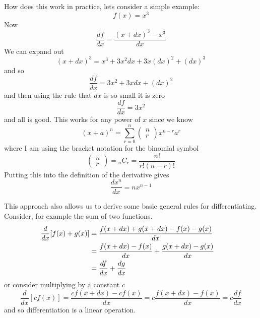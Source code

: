 \documentclass[12pt]{article}
\begin{document}
How does this work in practice, lets consider a simple example:
\begin{equation}
  f(x)=x^3
\end{equation}
Now
\begin{equation}
  \frac{df}{dx}=\frac{(x+dx)^3-x^3}{dx}
\end{equation}
We can expand out
\begin{equation}
  (x+dx)^3=x^3+3x^2dx+3x(dx)^2 + (dx)^3
\end{equation}
and so
\begin{equation}
  \frac{df}{dx}=3x^2+3xdx+(dx)^2
\end{equation}
and then using the rule that $dx$ is so small it is zero
\begin{equation}
  \frac{df}{dx}=3x^2
\end{equation}
and all is good. This works for any power of $x$ since we know
\begin{equation}
  (x+a)^n = \sum_{r=0}^n \left(\begin{array}{c}n\\r\end{array}\right)x^{n-r}a^r
\end{equation}
where I am using the bracket notation for the binomial symbol
\begin{equation}
  \left(\begin{array}{c}n\\r\end{array}\right)={}_nC_r=\frac{n!}{r!(n-r)!}
\end{equation}
Putting this into the definition of the derivative gives
\begin{equation}
  \frac{dx^n}{dx}=nx^{n-1}
\end{equation}

This approach also allows us to derive some basic general rules for differentiating. Consider, for example the sum of two functions.
\begin{align}
  \frac{d}{dx}[f(x)+g(x)]&=\frac{f(x+dx)+g(x+dx)-f(x)-g(x)}{dx}\cr
  &=\frac{f(x+dx)-f(x)}{dx}+\frac{g(x+dx)-g(x)}{dx}\cr
  &=\frac{df}{dx}+\frac{dg}{dx}
\end{align}
or consider multiplying by a constant $c$
\begin{equation}
  \frac{d}{dx}[cf(x)]=\frac{cf(x+dx)-cf(x)}{dx}=c\frac{f(x+dx)-f(x)}{dx}=c\frac{df}{dx}
\end{equation}
and so differentiation is a linear operation.
\end{document}
